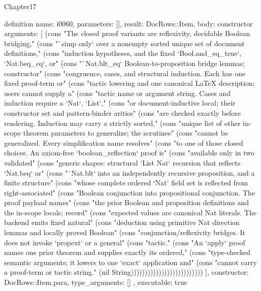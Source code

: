 \begin{lexlean}{Chapter17}
\begin{semanticmodule}
definition{
  name: i0060,
  parameters: [],
  result: DocRows::Item,
  body: constructor{
    arguments: [
      (cons "The closed proof variants are reflexivity, decidable Boolean bridging," (cons "`simp only` over a nonempty sorted unique set of document definitions," (cons "induction hypotheses, and the fixed `Bool.and_eq_true`, `Nat.beq_eq`, or" (cons "`Nat.blt_eq` Boolean-to-proposition bridge lemmas; constructor" (cons "congruence, cases, and structural induction. Each has one fixed proof-term or" (cons "tactic lowering and one canonical LaTeX description; users cannot supply a" (cons "tactic name or argument string. Cases and induction require a `Nat`, `List`," (cons "or document-inductive local; their constructor set and pattern-binder arities" (cons "are checked exactly before rendering. Induction may carry a strictly sorted," (cons "unique list of other in-scope theorem parameters to generalize; the scrutinee" (cons "cannot be generalized. Every simplification name resolves" (cons "to one of those closed choices. An axiom-free `boolean_reflection` proof is" (cons "available only in two validated" (cons "generic shapes: structural `List Nat` recursion that reflects `Nat.beq` or" (cons "`Nat.blt` into an independently recursive proposition, and a finite structure" (cons "whose complete ordered `Nat` field set is reflected from right-associated" (cons "Boolean conjunction into propositional conjunction. The proof payload names" (cons "the prior Boolean and proposition definitions and the in-scope locals; record" (cons "expected values are canonical Nat literals. The backend emits fixed natural" (cons "deduction using primitive Nat direction lemmas and locally proved Boolean" (cons "conjunction/reflexivity bridges. It does not invoke `propext` or a general" (cons "tactic." (cons "An `apply` proof names one prior theorem and supplies exactly its ordered," (cons "type-checked semantic arguments; it lowers to one `exact` application and" (cons "cannot carry a proof-term or tactic string." (nil String))))))))))))))))))))))))))
    ],
    constructor: DocRows::Item.para,
    type_arguments: []
  },
  executable: true
}


\end{semanticmodule}
\end{lexlean}
